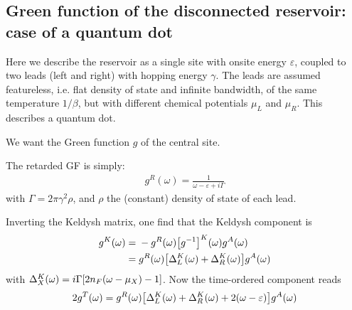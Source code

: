 \documentclass[12pt]{article}
\begin{document}



\begin{appendices}

\section{Green function of the disconnected reservoir: case of a quantum dot}

Here we describe the reservoir as a single site with onsite energy $\varepsilon$, coupled to two leads (left and right) with hopping energy $\gamma$. The leads are assumed featureless, i.e. flat density of state and infinite bandwidth, of the same temperature $1/\beta$, but with different chemical potentials $\mu_L$ and $\mu_R$. This describes a quantum dot.

We want the Green function $g$ of the central site.

The retarded GF is simply:
\begin{eqnarray}
	g^R(\omega) = \frac{1}{\omega - \varepsilon + i\Gamma}
\end{eqnarray}
with $\Gamma = 2\pi\gamma^2\rho$, and $\rho$ the (constant) density of state of each lead.

Inverting the Keldysh matrix, one find that the Keldysh component is
\begin{align}
	g^K(\omega) ={}& - g^R(\omega) \qty[g^{-1}]^K(\omega) g^A(\omega)
	\\
	={}& g^R(\omega) \qty[\Delta^K_L(\omega) + \Delta^K_R(\omega)] g^A(\omega)
\end{align}
with $\Delta^K_X(\omega) = i\Gamma \qty[2 n_F(\omega - \mu_X) - 1]$.
Now the time-ordered component reads
\begin{equation}
	2g^T(\omega) = g^R(\omega) \qty[\Delta^K_L(\omega) + \Delta^K_R(\omega) + 2(\omega - \varepsilon)] g^A(\omega)
\end{equation}


\end{appendices}
\end{document}
